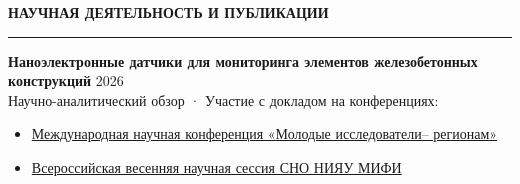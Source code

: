 \documentclass[10pt,a4paper]{article}
\newcommand{\linedsection}[1]{%
  \vspace{10pt}%
  \noindent
  {\bfseries\Large\color{primary} #1}%
  \par\vspace{3pt}%
  {{\color{primary}\hrule height 1pt}}
  \par\vspace{6pt}%
  \noindent
}
\begin{document}
\linedsection{НАУЧНАЯ ДЕЯТЕЛЬНОСТЬ И ПУБЛИКАЦИИ}
\vspace{2pt}
{\large \textbf{Наноэлектронные датчики для мониторинга элементов железобетонных конструкций}} \hfill \textcolor{subtext}{2026} \\
\small{Научно-аналитический обзор · Участие с докладом на конференциях:}
\begin{itemize}
    \item \href{https://github.com/koshelz/my-CV/blob/main/%D0%A1%D0%B5%D1%80%D1%82%D0%B8%D1%84%D0%B8%D0%BA%D0%B0%D1%82%20%D0%92%D0%BE%D0%93%D0%A3.pdf}{\color{accent}Международная научная конференция «Молодые исследователи– регионам»}
    \item \href{https://github.com/koshelz/my-CV/blob/main/%D0%A1%D0%B5%D1%80%D1%82%D0%B8%D1%84%D0%B8%D0%BA%D0%B0%D1%82%20%D1%81%20%D0%92%D0%9D%D0%A1%20%D0%A1%D0%9D%D0%9E.pdf}{\color{accent} Всероссийская весенняя научная сессия СНО НИЯУ МИФИ}
\end{itemize}
\end{document}
